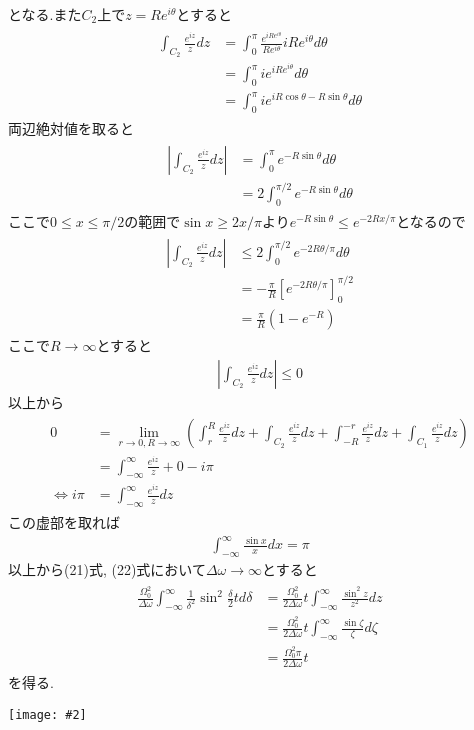 \documentclass[uplatex,a4j,11pt,dvipdfmx]{jsarticle}
\makeatletter
\def\fgcaption{\def\@captype{figure}\caption}
\newcommand{\mfig}[3][width=15cm]{
\begin{center}
\texttt{[image: \#2]}
\fgcaption{#3 \label{fig:#2}}
\end{center}
}
\makeatother
\begin{document}
となる.また$C_2$上で$z=Re^{i\theta}$とすると
\begin{align}
  \begin{split}
    \int_{C_2}\frac{e^{iz}}{z}dz&=\int_0^\pi\frac{e^{iRe^{i\theta}}}{Re^{i\theta}}iRe^{i\theta}d\theta\\
    &=\int_0^\pi ie^{iRe^{i\theta}}d\theta\\
    &=\int_0^\pi ie^{iR\cos\theta-R\sin\theta}d\theta
  \end{split}
\end{align}
両辺絶対値を取ると
\begin{align}
  \begin{split}
    \left|\int_{C_2}\frac{e^{iz}}{z}dz\right|&=\int_0^\pi e^{-R\sin\theta}d\theta\\
    &=2\int_0^{\pi/2} e^{-R\sin\theta}d\theta
  \end{split}
\end{align}
ここで$0\leq x\leq \pi/2$の範囲で$\sin x\geq 2x/\pi$より$e^{-R\sin\theta}\leq e^{-2Rx/\pi}$となるので
\begin{align}
  \begin{split}
    \left|\int_{C_2}\frac{e^{iz}}{z}dz\right|&\leq2\int_0^{\pi/2}e^{-2R\theta/\pi}d\theta\\
    &=-\frac{\pi}{R}\left[e^{-2R\theta/\pi}\right]^{\pi/2}_0\\
    &=\frac{\pi}{R}\left(1-e^{-R}\right)
  \end{split}
\end{align}
ここで$R\rightarrow\infty$とすると
\begin{align}
  \left|\int_{C_2}\frac{e^{iz}}{z}dz\right|\leq0
\end{align}
以上から
\begin{align}
  \begin{split}
    0&=\lim_{r\rightarrow0,R\rightarrow\infty}\left(\int_r^R\frac{e^{iz}}{z}dz+\int_{C_2}\frac{e^{iz}}{z}dz+\int_{-R}^{-r}\frac{e^{iz}}{z}dz+\int_{C_1}\frac{e^{iz}}{z}dz\right)\\
    &=\int_{-\infty}^{\infty}\frac{e^{iz}}{z}+0-i\pi\\
    \iff i\pi&=\int_{-\infty}^{\infty}\frac{e^{iz}}{z}dz
  \end{split}
\end{align}
この虚部を取れば
\begin{align}
  \int_{-\infty}^\infty\frac{\sin x}{x}dx=\pi
\end{align}
以上から(21)式, (22)式において$\Delta\omega\rightarrow\infty$とすると
\begin{align}
  \begin{split}
    \frac{\Omega_0^2}{\Delta\omega}\int_{-\infty}^\infty\frac{1}{\delta^2}\sin^2\frac{\delta}{2}td\delta
    &=\frac{\Omega_0^2}{2\Delta\omega}t\int_{-\infty}^\infty\frac{\sin^2z}{z^2}dz\\
    &=\frac{\Omega_0^2}{2\Delta\omega}t\int_{-\infty}^\infty\frac{\sin\zeta}{\zeta}d\zeta\\
    &=\frac{\Omega_0^2\pi}{2\Delta\omega}t
  \end{split}
\end{align}
を得る.
\mfig[width=10cm]{int.jpg}{積分経路}

\end{document}

